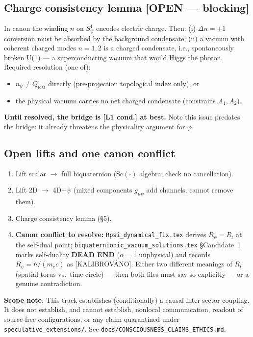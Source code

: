 \subsection{Charge consistency lemma [OPEN — blocking]}
\label{sec:bridge_charge}

In canon the winding $n$ on $S^1_\psi$ encodes electric charge. Then:
(i) $\Delta n = \pm1$ conversion must be absorbed by the background condensate;
(ii) a vacuum with coherent charged modes $n=1,2$ is a charged condensate,
i.e., spontaneously broken U(1) --- a superconducting vacuum that would Higgs
the photon. Required resolution (one of):
\begin{itemize}
  \item $n_\psi \neq Q_{\mathrm{EM}}$ directly (pre-projection topological index only), or
  \item the physical vacuum carries no net charged condensate (constrains $A_1, A_2$).
\end{itemize}
\textbf{Until resolved, the bridge is [L1 cond.] at best.} Note this issue predates
the bridge: it already threatens the physicality argument for $\varphi$.

\subsection{Open lifts and one canon conflict}
\label{sec:bridge_open}

\begin{enumerate}
  \item Lift scalar $\to$ full biquaternion (Sc$(\cdot)$ algebra; check no cancellation).
  \item Lift 2D $\to$ 4D+$\psi$ (mixed components $g_{\mu\psi}$ add channels, cannot remove them).
  \item Charge consistency lemma (§5).
  \item \textbf{Canon conflict to resolve:} \texttt{Rpsi\_dynamical\_fix.tex} derives
        $R_\psi = R_t$ at the self-dual point; \texttt{biquaternionic\_vacuum\_solutions.tex}
        \S{}Candidate~1 marks self-duality \textbf{DEAD END} ($\alpha = 1$ unphysical) and
        records $R_\psi = \hbar/(m_e c)$ as [KALIBROVÁNO]. Either two different meanings
        of $R_t$ (spatial torus vs.\ time circle) --- then both files must say so explicitly ---
        or a genuine contradiction.
\end{enumerate}

\noindent\textbf{Scope note.} This track establishes (conditionally) a causal inter-sector
coupling. It does not establish, and cannot establish, nonlocal communication,
readout of source-free configurations, or any claim quarantined under
\texttt{speculative\_extensions/}. See \texttt{docs/CONSCIOUSNESS\_CLAIMS\_ETHICS.md}.
